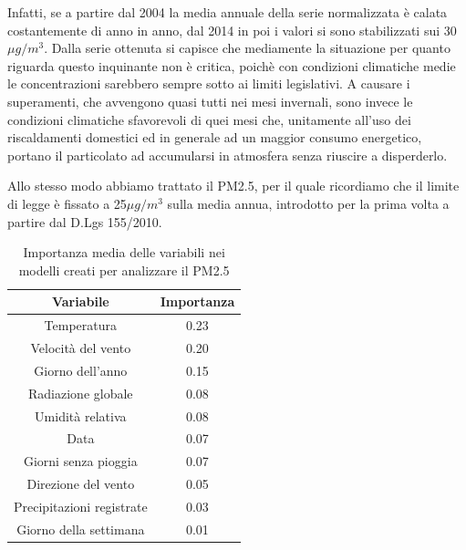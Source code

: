 \documentclass[a4paper]{report}
\begin{document}
Infatti, se a partire dal 2004 la media annuale della serie normalizzata è calata costantemente di anno in anno, dal 2014 in poi i valori si sono stabilizzati sui 30$\mu g/m^3$. Dalla serie ottenuta si capisce che mediamente la situazione per quanto riguarda questo inquinante non è critica, poichè con condizioni climatiche medie le concentrazioni sarebbero sempre sotto ai limiti legislativi. A causare i superamenti, che avvengono quasi tutti nei mesi invernali, sono invece le condizioni climatiche sfavorevoli di quei mesi che, unitamente all'uso dei riscaldamenti domestici ed in generale ad un maggior consumo energetico, portano il particolato ad accumularsi in atmosfera senza riuscire a disperderlo.


Allo stesso modo abbiamo trattato il PM2.5, per il quale ricordiamo che il limite di legge è fissato a 25$\mu g/m^3$ sulla media annua, introdotto per la prima volta a partire dal D.Lgs 155/2010.

\begin{table}[h!]
\centering
\begin{tabular}{ |c c| }
	\hline
	Variabile & Importanza \\
	\hline
	Temperatura & 0.23 \\
	Velocità del vento & 0.20 \\
	Giorno dell'anno & 0.15 \\
	Radiazione globale & 0.08 \\
	Umidità relativa & 0.08 \\
	Data & 0.07 \\
	Giorni senza pioggia & 0.07 \\
	Direzione del vento & 0.05 \\
	Precipitazioni registrate & 0.03 \\
	Giorno della settimana & 0.01 \\
	\hline
\end{tabular}
\caption{Importanza media delle variabili nei modelli creati per analizzare il PM2.5}
\label{table:importanza_pm25}
\end{table}
\end{document}
